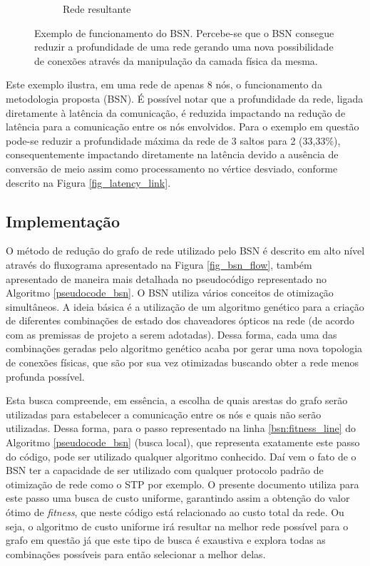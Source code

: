 \begin{figure}[t!]
\begin{subfigure}[t]{0.4\textwidth}
	\caption{Rede resultante}
	\label{BSN-example-rede-otimizada}
	\end{subfigure}
	\caption[Exemplo de funcionamento do BSN]{Exemplo de funcionamento do BSN. Percebe-se que o BSN consegue reduzir a profundidade de uma rede gerando uma nova possibilidade de conexões através da manipulação da camada física da mesma.}
	\label{fig-bsn-exemplo}
\end{figure}

Este exemplo ilustra, em uma rede de apenas 8 nós, o funcionamento da metodologia proposta (BSN). É possível notar que a profundidade da rede, ligada diretamente à latência da comunicação, é reduzida impactando na redução de latência para a comunicação entre os nós envolvidos. Para o exemplo em questão pode-se reduzir a profundidade máxima da rede de 3 saltos para 2 (33,33\%), consequentemente impactando diretamente na latência devido a ausência de conversão de meio assim como processamento no vértice desviado, conforme descrito na Figura \ref{fig_latency_link}. 

\subsection{Implementação}
\label{implementacao}
O método de redução do grafo de rede utilizado pelo BSN é descrito em alto nível através do fluxograma apresentado na Figura \ref{fig_bsn_flow}, também apresentado de maneira mais detalhada no pseudocódigo representado no Algoritmo \ref{pseudocode_bsn}. O BSN utiliza vários conceitos de otimização simultâneos. A ideia básica é a utilização de um algoritmo genético para a criação de diferentes combinações de estado dos chaveadores ópticos na rede (de acordo com as premissas de projeto a serem adotadas). Dessa forma, cada uma das combinações geradas pelo algoritmo genético acaba por gerar uma nova topologia de conexões físicas, que são por sua vez otimizadas buscando obter a rede menos profunda possível. 

Esta busca compreende, em essência, a escolha de quais arestas do grafo serão utilizadas para estabelecer a comunicação entre os nós e quais não serão utilizadas. Dessa forma, para o passo representado na linha \ref{bsn:fitness_line} do Algoritmo \ref{pseudocode_bsn} (busca local), que representa exatamente este passo do código, pode ser utilizado qualquer algoritmo conhecido. Daí vem o fato de o BSN ter a capacidade de ser utilizado com qualquer protocolo padrão de otimização de rede como o STP por exemplo. O presente documento utiliza para este passo uma busca de custo uniforme, garantindo assim a obtenção do valor ótimo de \emph{fitness}, que neste código está relacionado ao custo total da rede. Ou seja, o algoritmo de custo uniforme irá resultar na melhor rede possível para o grafo em questão já que este tipo de busca é exaustiva e explora todas as combinações possíveis para então selecionar a melhor delas.

